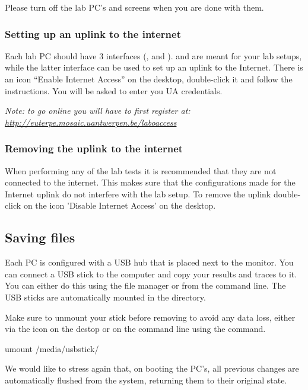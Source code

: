 Please turn off the lab PC's and screens when you are done with them.

\subsubsection*{Setting up an uplink to the internet}

Each lab PC should have 3 interfaces (,  and ).  and  are meant for your lab setups, while the latter interface can be used to set up an uplink to the Internet. There is an icon ``Enable Internet Access'' on the desktop, double-click it and follow the instructions. You will be asked to enter you UA credentials. 

\emph{Note: to go online you will have to first register at: \url{http://euterpe.mosaic.uantwerpen.be/laboaccess}}

\subsubsection*{Removing the uplink to the internet}

When performing any of the lab tests it is recommended that they are not connected to the internet. This makes sure that the configurations made for the Internet uplink do not interfere with the lab setup. To remove the uplink double-click on the icon 'Disable Internet Access' on the desktop.

\newpage
\subsection{Saving files}

Each PC is configured with a USB hub that is placed next to the monitor. You can connect a USB stick to the computer and copy your results and traces to it. You can either do this using the file manager or from the command line. The USB sticks are automatically mounted in the  directory.

Make sure to unmount your stick before removing to avoid any data loss, either via the icon on the destop or on the command line using the  command.

\begin{cmdblock}
	umount /media/usbstick/
\end{cmdblock}

We would like to stress again that, on booting the PC's, all previous changes are automatically flushed from the system, returning them to their original state.

